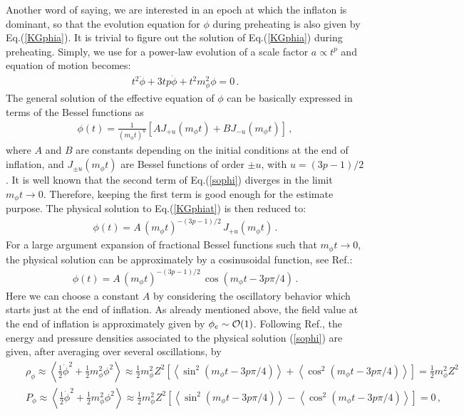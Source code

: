 \documentclass[aps,prd,amsmath,amssymb,preprintnumbers,onecolumn,11pt,nofootinbib]{revtex4}
\begin{document}
Another word of saying, we are interested in an epoch at which the inflaton is dominant, so that the evolution equation for $\phi$ during preheating is also given by Eq.(\ref{KGphia}). It is trivial to figure out the solution of Eq.(\ref{KGphia}) during preheating. Simply, we use for a power-law evolution of a scale factor $a \propto t^{p}$ and equation of motion becomes:
\begin{eqnarray} \label{KGphiat}
t^{2}\ddot{\phi} + 3tp\dot{\phi}+t^{2}m^{2}_{\phi}\phi =  0\,.
\end{eqnarray}
The general solution of the effective equation of $\phi$ can be basically expressed in terms of the Bessel functions as 
\begin{eqnarray} \label{sophi}
\phi(t) = \frac{1}{(m_{\phi}t)^{u}}\left[AJ_{+u}(m_{\phi}t) + BJ_{-u}(m_{\phi}t)\right]\,,
\end{eqnarray}
where $A$ and $B$ are constants depending on the initial conditions at the end of inflation, and $J_{\pm u}(m_{\phi}t)$ are Bessel functions of order $\pm u$, with $u=(3p-1)/2$. It is well known that the second term of Eq.(\ref{sophi}) diverges in the limit $m_{\phi}t\rightarrow 0$. Therefore, keeping the first term is good enough for the estimate purpose. The physical solution to Eq.(\ref{KGphiat}) is then reduced to:
\begin{eqnarray} \label{sophi1}
\phi(t) = A\,(m_{\phi}t)^{-(3p-1)/2}\,J_{+u}(m_{\phi}t)\,.
\end{eqnarray}
For a large argument expansion of fractional Bessel functions such that $m_{\phi}t\rightarrow 0$, the physical solution can be approximately by a cosinusoidal function, see Ref.\cite{GarciaBellido:2008ab}:
\begin{eqnarray} \label{sophire}
\phi(t) = A\,(m_{\phi}t)^{-(3p-1)/2}\,\cos(m_{\phi}t - 3p\pi/4)\,.
\end{eqnarray}
Here we can choose a constant $A$ by considering the oscillatory behavior which starts just at the end of inflation. As already mentioned above, the field value at the end of inflation is approximately given by $\phi_{e} \sim {\cal O}(1)$. Following Ref.\cite{GarciaBellido:2008ab}, the energy and pressure densities associated to the physical solution (\ref{sophi}) are given, after averaging over several oscillations, by
\begin{eqnarray} \label{omega}
&&\rho_{\phi} \approx \left<\frac{1}{2}{\dot \phi}^{2} + \frac{1}{2}m^{2}_{\phi}\phi^{2}\right> 
\approx \frac{1}{2}m^{2}_{\phi}Z^{2}\left[\left<\sin^{2}(m_{\phi}t - 3p\pi/4)\right> + \left<\cos^{2}(m_{\phi}t - 3p\pi/4)\right>\right] 
= \frac{1}{2}m^{2}_{\phi}Z^{2}\nonumber\\
&&P_{\phi} \approx \left<\frac{1}{2}{\dot \phi}^{2} + \frac{1}{2}m^{2}_{\phi}\phi^{2}\right> 
\approx \frac{1}{2}m^{2}_{\phi}Z^{2}\left[\left<\sin^{2}(m_{\phi}t - 3p\pi/4)\right> - \left<\cos^{2}(m_{\phi}t - 3p\pi/4)\right>\right] 
=0\,,
\end{eqnarray}
\end{document}
